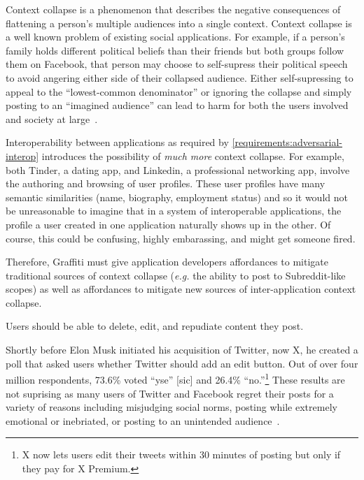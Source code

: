 Context collapse is a phenomenon that describes the negative consequences of flattening
a person's multiple audiences into a single context.
Context collapse is a well known problem of existing social applications.
For example, if a person's family holds different political beliefs than their friends
but both groups follow them on Facebook, that person may choose to self-supress their political
speech to avoid angering either side of their collapsed audience.
Either self-supressing to appeal to the ``lowest-common denominator'' or ignoring the collapse
and simply posting to an ``imagined audience'' can lead to harm for both
the users involved and society at large~\cite{contextcollapse, contextcollapseimpact, contextcollapsequeer, spiralofsilencesocialmedia}.

Interoperability between applications as required by \ref{requirements:adversarial-interop} introduces the possibility
of \emph{much more} context collapse.
For example, both Tinder, a dating app, and Linkedin, a professional networking app, involve the authoring
and browsing of user profiles.
These user profiles have many semantic similarities (name, biography, employment status) and so
it would not be unreasonable to imagine that in a system of interoperable applications,
the profile a user created in one application
naturally shows up in the other.
Of course, this could be confusing, highly embarassing, and might get someone fired.

Therefore, Graffiti must give application developers affordances to mitigate traditional sources
of context collapse (\emph{e.g.} the ability to post to Subreddit-like scopes)
as well as affordances to mitigate new sources of inter-application context collapse.


\begin{requirement}[Forgiving]
\label{requirements:forgiving}
    Users should be able to delete, edit, and repudiate content they post.
\end{requirement}

Shortly before Elon Musk initiated his acquisition of Twitter, now X,
he created a poll that asked users whether Twitter should add an edit button.
Out of over four million respondents, 73.6\% voted ``yse'' [sic] and 26.4\% ``no.''\footnote{
  X now lets users edit their tweets within 30 minutes of posting but only
  if they pay for X Premium.
} These results are not suprising as many users of Twitter and Facebook regret
their posts for a variety of reasons
including misjudging social norms, posting while extremely emotional or inebriated,
or posting to an unintended audience~\cite{regret, regrettwitter}.

